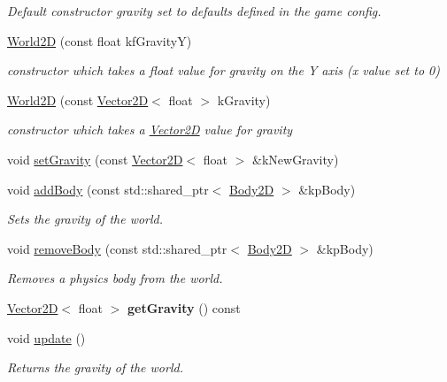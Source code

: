 \begin{DoxyCompactItemize}
\begin{DoxyCompactList}\small\item\em Default constructor gravity set to defaults defined in the game config. \end{DoxyCompactList}\item 
\hyperlink{class_world2_d_aafc2d5d9e7bb942f7ff3e42efbfcb342}{World2\+D} (const float kf\+Gravity\+Y)
\begin{DoxyCompactList}\small\item\em constructor which takes a float value for gravity on the Y axis (x value set to 0) \end{DoxyCompactList}\item 
\hyperlink{class_world2_d_a92ca33579f69ba0b700c2939c7ac974e}{World2\+D} (const \hyperlink{class_vector2_d}{Vector2\+D}$<$ float $>$ k\+Gravity)
\begin{DoxyCompactList}\small\item\em constructor which takes a \hyperlink{class_vector2_d}{Vector2\+D} value for gravity \end{DoxyCompactList}\item 
void \hyperlink{class_world2_d_aed2aed4e74b5948e763103084af53409}{set\+Gravity} (const \hyperlink{class_vector2_d}{Vector2\+D}$<$ float $>$ \&k\+New\+Gravity)
\item 
void \hyperlink{class_world2_d_a459ea9e31251a6459b19204662b2252b}{add\+Body} (const std\+::shared\+\_\+ptr$<$ \hyperlink{class_body2_d}{Body2\+D} $>$ \&kp\+Body)
\begin{DoxyCompactList}\small\item\em Sets the gravity of the world. \end{DoxyCompactList}\item 
void \hyperlink{class_world2_d_a48b1d86c6dd7a8a3b76a4916f533b61e}{remove\+Body} (const std\+::shared\+\_\+ptr$<$ \hyperlink{class_body2_d}{Body2\+D} $>$ \&kp\+Body)
\begin{DoxyCompactList}\small\item\em Removes a physics body from the world. \end{DoxyCompactList}\item 
\hypertarget{class_world2_d_a205352eb05a8bb435c23de88eb9d43b1}{\hyperlink{class_vector2_d}{Vector2\+D}$<$ float $>$ {\bfseries get\+Gravity} () const }\label{class_world2_d_a205352eb05a8bb435c23de88eb9d43b1}

\item 
void \hyperlink{class_world2_d_a63d6bc0267d3df143cb739510b26e7cc}{update} ()
\begin{DoxyCompactList}\small\item\em Returns the gravity of the world. \end{DoxyCompactList}\end{DoxyCompactItemize}


